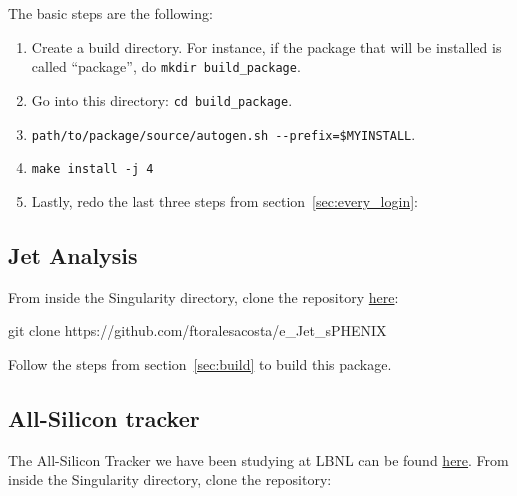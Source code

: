 \documentclass[12pt]{article}
\begin{document}
The basic steps are the following:

\begin{enumerate}
\item Create a build directory. For instance, if the package that will be installed is called ``package'', do \verb|mkdir build_package|.
\item Go into this directory: \verb|cd build_package|.
\item \verb|path/to/package/source/autogen.sh --prefix=$MYINSTALL|.
\item \verb|make install -j 4|
\item Lastly, redo the last three steps from section~\ref{sec:every_login}:

\begin{tcolorbox}
\end{tcolorbox}

\end{enumerate}

\subsection{Jet Analysis}

From inside the Singularity directory, clone the repository \href{https://github.com/ftoralesacosta/e_Jet_sPHENIX}{here}:

\begin{tcolorbox}
\begin{verbnobox}[\scriptsize]
git clone https://github.com/ftoralesacosta/e_Jet_sPHENIX
\end{verbnobox}  
\end{tcolorbox}

Follow the steps from section~\ref{sec:build} to build this package.

\subsection{All-Silicon tracker}

The All-Silicon Tracker we have been studying at LBNL can be found \href{https://github.com/eic/g4lblvtx}{here}.
From inside the Singularity directory, clone the repository:
\end{document}
